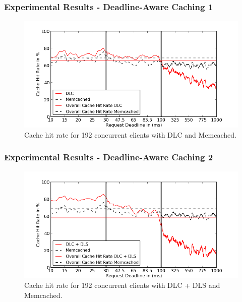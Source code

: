 \documentclass{beamer}
\begin{document}
\begin{frame}
  \frametitle{Experimental Results - Deadline-Aware Caching 1}
  \begin{figure}[t]
    \begin{center}
      \centerline{\includegraphics[scale=0.5]{img/EC2/EC2_CS_MM/cache_48.png}}
      \caption{Cache hit rate for 192 concurrent clients with DLC and Memcached.}
      \label{fig:cache_192_cs_mm}
    \end{center}
  \end{figure}
\end{frame}

\begin{frame}
  \frametitle{Experimental Results - Deadline-Aware Caching 2}
  \begin{figure}[t]
    \begin{center}
      \centerline{\includegraphics[scale=0.5]{img/EC2/EC2_SH_MM/cache_48.png}}
      \caption{Cache hit rate for 192 concurrent clients with DLC + DLS and Memcached.}
      \label{fig:cache_192_sh_mm}
    \end{center}
  \end{figure}
\end{frame}
\end{document}
